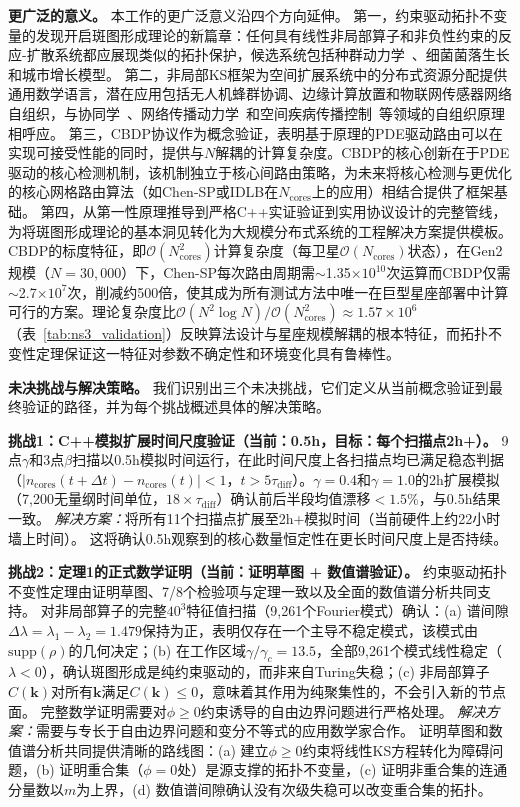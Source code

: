 \documentclass[sn-nature,pdflatex]{sn-jnl}
\begin{document}
\bigskip\noindent\textbf{更广泛的意义。}
本工作的更广泛意义沿四个方向延伸。
第一，约束驱动拓扑不变量的发现开启斑图形成理论的新篇章：任何具有线性非局部算子和非负性约束的反应-扩散系统都应展现类似的拓扑保护，候选系统包括种群动力学~\cite{meron_2015}、细菌菌落生长和城市增长模型。
第二，非局部KS框架为空间扩展系统中的分布式资源分配提供通用数学语言，潜在应用包括无人机蜂群协调、边缘计算放置和物联网传感器网络自组织，与协同学~\cite{haken_1983}、网络传播动力学~\cite{pastor_satorras_2015}和空间疾病传播控制~\cite{sun_2025_physrep}等领域的自组织原理相呼应。
第三，CBDP协议作为概念验证，表明基于原理的PDE驱动路由可以在实现可接受性能的同时，提供与$N$解耦的计算复杂度。CBDP的核心创新在于PDE驱动的核心检测机制，该机制独立于核心间路由策略，为未来将核心检测与更优化的核心网格路由算法（如Chen-SP或IDLB在$N_{\text{cores}}$上的应用）相结合提供了框架基础。
第四，从第一性原理推导到严格C++实证验证到实用协议设计的完整管线，为将斑图形成理论的基本洞见转化为大规模分布式系统的工程解决方案提供模板。
CBDP的标度特征，即$\mathcal{O}(N_{\text{cores}}^2)$计算复杂度（每卫星$\mathcal{O}(N_{\text{cores}})$状态），在Gen2规模（$N=30,000$）下，Chen-SP每次路由周期需$\sim$1.35$\times 10^{10}$次运算而CBDP仅需$\sim$2.7$\times 10^{7}$次，削减约500倍，使其成为所有测试方法中唯一在巨型星座部署中计算可行的方案。理论复杂度比$\mathcal{O}(N^2\log N)/\mathcal{O}(N_{\text{cores}}^2) \approx 1.57\times10^6$（表~\ref{tab:ns3_validation}）反映算法设计与星座规模解耦的根本特征，而拓扑不变性定理保证这一特征对参数不确定性和环境变化具有鲁棒性。

\bigskip\noindent\textbf{未决挑战与解决策略。}
我们识别出三个未决挑战，它们定义从当前概念验证到最终验证的路径，并为每个挑战概述具体的解决策略。

\medskip
\noindent\textbf{挑战1：C++模拟扩展时间尺度验证（当前：0.5h，目标：每个扫描点2h+）。}
9点$\gamma$和3点$\beta$扫描以0.5h模拟时间运行，在此时间尺度上各扫描点均已满足稳态判据（$|n_{\text{cores}}(t + \Delta t) - n_{\text{cores}}(t)| < 1$，$t > 5\tau_{\text{diff}}$）。$\gamma = 0.4$和$\gamma = 1.0$的2h扩展模拟（7,200无量纲时间单位，$18\times\tau_{\text{diff}}$）确认前后半段均值漂移$<1.5\%$，与0.5h结果一致。
\textit{解决方案：}将所有11个扫描点扩展至2h+模拟时间（当前硬件上约22小时墙上时间）。
这将确认0.5h观察到的核心数量恒定性在更长时间尺度上是否持续。

\medskip
\noindent\textbf{挑战2：定理1的正式数学证明（当前：证明草图 + 数值谱验证）。}
约束驱动拓扑不变性定理由证明草图、7/8个检验项与定理一致以及全面的数值谱分析共同支持。
对非局部算子的完整$40^3$特征值扫描（9,261个Fourier模式）确认：(a) 谱间隙$\Delta\lambda = \lambda_1 - \lambda_2 = 1.479$保持为正，表明仅存在一个主导不稳定模式，该模式由$\text{supp}(\rho)$的几何决定；(b) 在工作区域$\gamma/\gamma_c = 13.5$，全部9,261个模式线性稳定（$\lambda < 0$），确认斑图形成是纯约束驱动的，而非来自Turing失稳；(c) 非局部算子$C(\mathbf{k})$对所有$\mathbf{k}$满足$C(\mathbf{k}) \le 0$，意味着其作用为纯聚集性的，不会引入新的节点面。
完整数学证明需要对$\phi \ge 0$约束诱导的自由边界问题进行严格处理。
\textit{解决方案：}需要与专长于自由边界问题和变分不等式的应用数学家合作。
证明草图和数值谱分析共同提供清晰的路线图：(a) 建立$\phi \ge 0$约束将线性KS方程转化为障碍问题，(b) 证明重合集（$\phi = 0$处）是源支撑的拓扑不变量，(c) 证明非重合集的连通分量数以$m$为上界，(d) 数值谱间隙确认没有次级失稳可以改变重合集的拓扑。
\end{document}
